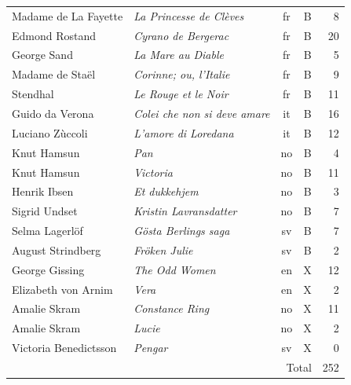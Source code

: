 \begin{longtable}{@{}p{34mm}p{71mm}ccr@{}}
Madame de La Fayette & \emph{La Princesse de Clèves} & fr & B & 8 \\
Edmond Rostand & \emph{Cyrano de Bergerac} & fr & B & 20 \\
George Sand & \emph{La Mare au Diable} & fr & B & 5 \\
Madame de Staël & \emph{Corinne; ou, l'Italie} & fr & B & 9 \\
Stendhal & \emph{Le Rouge et le Noir} & fr & B & 11 \\
Guido da Verona & \emph{Colei che non si deve amare} & it & B & 16 \\
Luciano Zùccoli & \emph{L'amore di Loredana} & it & B & 12 \\
Knut Hamsun & \emph{Pan} & no & B & 4 \\
Knut Hamsun & \emph{Victoria} & no & B & 11 \\
Henrik Ibsen & \emph{Et dukkehjem} & no & B & 3 \\
Sigrid Undset & \emph{Kristin Lavransdatter} & no & B & 7 \\
Selma Lagerlöf & \emph{Gösta Berlings saga} & sv & B & 7 \\
August Strindberg & \emph{Fröken Julie} & sv & B & 2 \\
George Gissing & \emph{The Odd Women} & en & X & 12 \\
Elizabeth von Arnim & \emph{Vera} & en & X & 2 \\
Amalie Skram & \emph{Constance Ring} & no & X & 11 \\
Amalie Skram & \emph{Lucie} & no & X & 2 \\
Victoria Benedictsson & \emph{Pengar} & sv & X & 0 \\
\midrule
\multicolumn{4}{r}{Total} & 252\\
\end{longtable}
\endgroup
